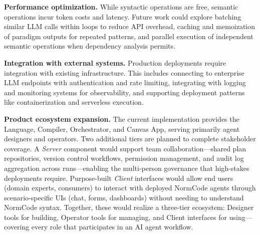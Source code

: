 \textbf{Performance optimization.} While syntactic operations are free, semantic operations incur token costs and latency. Future work could explore batching similar LLM calls within loops to reduce API overhead, caching and memoization of paradigm outputs for repeated patterns, and parallel execution of independent semantic operations when dependency analysis permits.

\textbf{Integration with external systems.} Production deployments require integration with existing infrastructure. This includes connecting to enterprise LLM endpoints with authentication and rate limiting, integrating with logging and monitoring systems for observability, and supporting deployment patterns like containerization and serverless execution.

\textbf{Product ecosystem expansion.} The current implementation provides the Language, Compiler, Orchestrator, and Canvas App, serving primarily agent designers and operators. Two additional tiers are planned to complete stakeholder coverage. A \textit{Server} component would support team collaboration---shared plan repositories, version control workflows, permission management, and audit log aggregation across runs---enabling the multi-person governance that high-stakes deployments require. Purpose-built \textit{Client} interfaces would allow end users (domain experts, consumers) to interact with deployed NormCode agents through scenario-specific UIs (chat, forms, dashboards) without needing to understand NormCode syntax. Together, these would realize a three-tier ecosystem: Designer tools for building, Operator tools for managing, and Client interfaces for using---covering every role that participates in an AI agent workflow.

